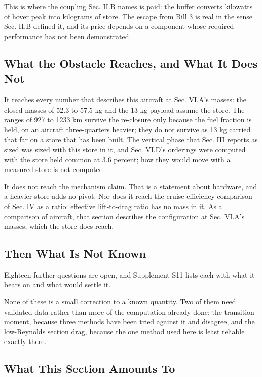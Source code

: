 \documentclass[journal]{new-aiaa}
\begin{document}
This is where the coupling Sec. II.B names is paid: the buffer converts kilowatts of hover peak into kilograms of store. The escape from Bill 3 is real in the sense Sec. II.B defined it, and its price depends on a component whose required performance has not been demonstrated.

\subsection{What the Obstacle Reaches, and What It Does Not}

It reaches every number that describes this aircraft at Sec. VI.A's masses: the closed masses of 52.3 to 57.5 kg and the 13 kg payload assume the store. The ranges of 927 to 1233 km survive the re-closure only because the fuel fraction is held, on an aircraft three-quarters heavier; they do not survive as 13 kg carried that far on a store that has been built. The vertical phase that Sec. III reports as sized was sized with this store in it, and Sec. VI.D's orderings were computed with the store held common at 3.6 percent; how they would move with a measured store is not computed.

It does not reach the mechanism claim. That is a statement about hardware, and a heavier store adds no pivot. Nor does it reach the cruise-efficiency comparison of Sec. IV as a ratio: effective lift-to-drag ratio has no mass in it. As a comparison of aircraft, that section describes the configuration at Sec. VI.A's masses, which the store does reach.

\subsection{Then What Is Not Known}

Eighteen further questions are open, and Supplement S11 lists each with what it bears on and what would settle it.

None of these is a small correction to a known quantity. Two of them need validated data rather than more of the computation already done: the transition moment, because three methods have been tried against it and disagree, and the low-Reynolds section drag, because the one method used here is least reliable exactly there.

\subsection{What This Section Amounts To}
\end{document}
